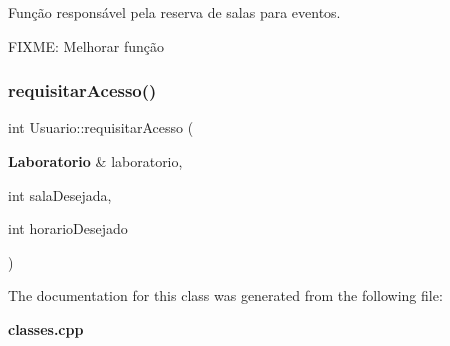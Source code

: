 Função responsável pela reserva de salas para eventos. 

F\+I\+X\+ME\+: Melhorar função \mbox{\label{class_usuario_aa24978a1815ad66c45a4084b747691eb}} 
\subsubsection{requisitar\+Acesso()}
{\footnotesize\ttfamily int Usuario\+::requisitar\+Acesso (\begin{DoxyParamCaption}\item[{\textbf{ Laboratorio} \&}]{laboratorio,  }\item[{int}]{sala\+Desejada,  }\item[{int}]{horario\+Desejado }\end{DoxyParamCaption})}



The documentation for this class was generated from the following file\+:\begin{DoxyCompactItemize}
\item 
\textbf{ classes.\+cpp}\end{DoxyCompactItemize}
